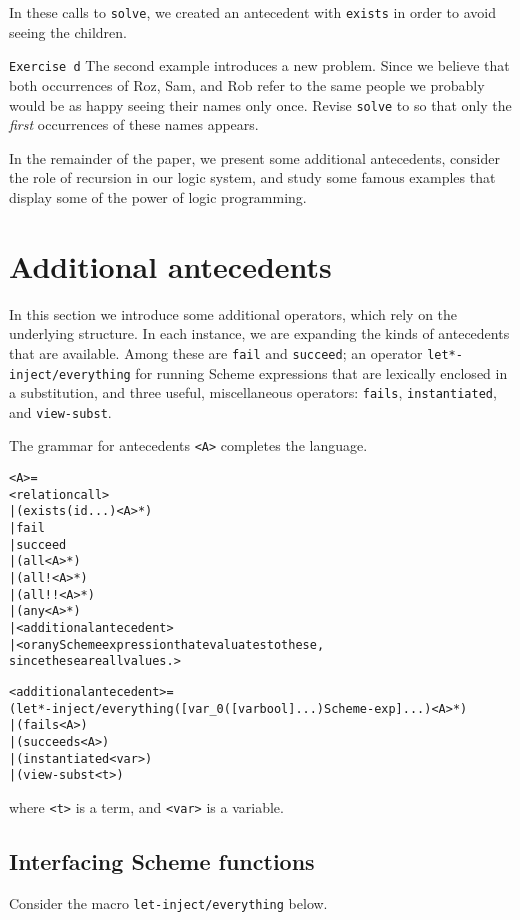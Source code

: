 \noindent
In these calls to \texttt{solve}, we created an antecedent with
\texttt{exists} in order to avoid seeing the children.

\texttt{Exercise d} The second example introduces a new problem.
Since we believe that both occurrences of Roz, Sam, and Rob refer to
the same people we probably would be as happy seeing their names only
once.  Revise \texttt{solve} to so that only the \emph{first} occurrences of
these names appears.\endofexercise{}

In the remainder of the paper, we present some additional antecedents,
consider the role of recursion in our logic system, and study some
famous examples that display some of the power of logic programming.

\section{Additional antecedents}

In this section we introduce some additional operators, which rely on
the underlying structure.  In each instance, we are expanding the
kinds of antecedents that are available.  Among these are
\texttt{fail} and \texttt{succeed}; an operator
\texttt{let*-inject/everything} for running Scheme expressions that
are lexically enclosed in a substitution, and three useful,
miscellaneous operators: \texttt{fails}, \texttt{instantiated}, and
\texttt{view-subst}.

The grammar for antecedents \texttt{<A>} completes the language.
\begin{alltt}
<A> =
     <relation call>
   | (exists (id ...) <A>*)
   | fail
   | succeed
   | (all <A>*)
   | (all! <A>*)
   | (all!! <A>*)
   | (any <A>*)
   | <additional antecedent>
   | <or any Scheme expression that evaluates to these,
       since these are all values.>

<additional antecedent> =
     (let*-inject/everything ([var_0 ([var bool] ...) Scheme-exp] ...) <A>*)
   | (fails <A>)
   | (succeeds <A>)
   | (instantiated <var>)
   | (view-subst <t>)
\end{alltt}

\noindent
where \texttt{<t>} is a term, and \texttt{<var>} is a variable.

\subsection{Interfacing Scheme functions}

Consider the macro \texttt{let-inject/everything} below.

